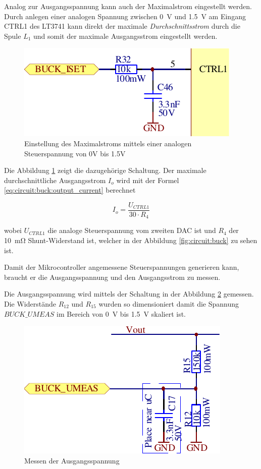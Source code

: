 Analog zur Ausgangsspannung kann auch der Maximalstrom eingestellt werden. Durch
anlegen einer  analogen  Spannung  zwischen \SI{0}{\volt} und \SI{1.5}{\volt} am
Eingang  CTRL1 des LT3741 kann  direkt  der  maximale  \emph{Durchschnittsstrom}
durch die Spule $L_1$ und  somit  der maximale Ausgangsstrom eingestellt werden.

\begin{figure}[th!]
    \center
    \includegraphics[width=.4\textwidth]{images/circuit/buck-iset.pdf}
    \caption{Einstellung des Maximalstroms mittels einer analogen Steuerspannung von 0V bis 1.5V}
    \label{fig:circuit:buck:iset}
\end{figure}

Die Abbildung \ref{fig:circuit:buck:iset} zeigt  die  dazugeh\"orige  Schaltung.
Der   maximale  durchschnittliche  Ausgangsstrom  $I_o$  wird  mit  der   Formel
\ref{eq:circuit:buck:output_current} berechnet

\begin{equation}
    I_o = \frac{U_{CTRL1}}{30 \cdot R_4}
    \label{eq:circuit:buck:output_current}
\end{equation}

wobei $U_{CTRL1}$ die  analoge  Steuerspannung vom zweiten DAC ist und $R_4$ der
\SI{10}{\milli\ohm}    Shunt-Widerstand    ist,   welcher   in   der   Abbildung
\ref{fig:circuit:buck} zu sehen ist.

Damit der Mikrocontroller angemessene Steuerspannungen  generieren kann, braucht
er die Ausgangsspannung und den Ausgangsstrom zu messen.

Die   Ausgangsspannung   wird   mittels   der   Schaltung   in   der   Abbildung
\ref{fig:circuit:buck:umeas} gemessen. Die Widerst\"ande $R_{12}$  und  $R_{15}$
wurden  so  dimensioniert  damit  die  Spannung  $BUCK\_UMEAS$  im  Bereich  von
\SI{0}{\volt} bis \SI{1.5}{\volt} skaliert ist.

\begin{figure}[th!]
    \center
    \includegraphics[width=.45\textwidth]{images/circuit/buck-umeas.pdf}
    \caption{Messen der Ausgangsspannung}
    \label{fig:circuit:buck:umeas}
\end{figure}

